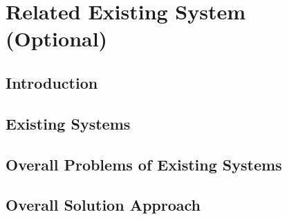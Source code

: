 \chapter{Related Existing System (Optional)}

\section{Introduction}

\section{Existing Systems}

\section{Overall Problems of Existing Systems}

\section{Overall Solution Approach}